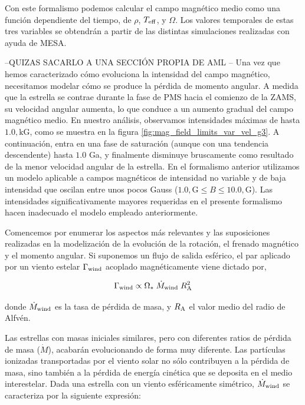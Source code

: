 Con este formalismo podemos calcular el campo magnético medio como una función dependiente del tiempo, de $\rho$, $T_{\mathrm{eff}}$, y $\Omega$. Los valores temporales de estas tres variables se obtendrán a partir de las distintas simulaciones realizadas con ayuda de MESA. \par


--QUIZAS SACARLO A UNA SECCIÓN PROPIA DE AML --
Una vez que hemos caracterizado cómo evoluciona la intensidad del campo magnético, necesitamos modelar cómo se produce la pérdida de momento angular. A medida que la estrella se contrae durante la fase de PMS hacia el comienzo de la ZAMS, su velocidad angular aumenta, lo que conduce a un aumento gradual del campo magnético medio. En nuestro análisis, observamos intensidades máximas de hasta $1.0,\mathrm{kG}$, como se muestra en la figura \ref{fig:mag_field_limits_var_vel_g3}. A continuación, entra en una fase de saturación (aunque con una tendencia descendente) hasta $1.0$ Ga, y finalmente disminuye bruscamente como resultado de la menor velocidad angular de la estrella. En el formalismo anterior utilizamos un modelo aplicable a campos magnéticos de intensidad no variable y de baja intensidad que oscilan entre unos pocos Gauss ($1.0,\mathrm{G} \leq B \leq 10.0,\mathrm{G}$). Las intensidades significativamente mayores requeridas en el presente formalismo hacen inadecuado el modelo empleado anteriormente.\par


Comencemos por enumerar los aspectos más relevantes y las suposiciones realizadas en la modelización de la evolución de la rotación, el frenado magnético y el momento angular. Si suponemos un flujo de salida esférico, el par aplicado por un viento estelar $\Gamma_{\mathrm{wind}}$ acoplado magnéticamente viene dictado por,

\begin{equation}
	\Gamma_{\mathrm{wind}} \propto \Omega_* \; \Dot{M}_{\mathrm{wind}} \; R_{\mathrm{A}}^{2} \label{eq:mb_torque}
\end{equation}

donde $\Dot{M}_{\mathrm{wind}}$ es la tasa de pérdida de masa, y $R_{\mathrm{A}}$ el valor medio del radio de Alfvén. \par

Las estrellas con masas iniciales similares, pero con diferentes ratios de pérdida de masa ($\Dot{M}$), acabarán evolucionando de forma muy diferente. Las partículas ionizadas transportadas por el viento solar no sólo contribuyen a la pérdida de masa, sino también a la pérdida de energía cinética que se deposita en el medio interestelar. Dada una estrella con un viento esféricamente simétrico, $\Dot{M}_{\mathrm{wind}}$ se caracteriza por la siguiente expresión:

